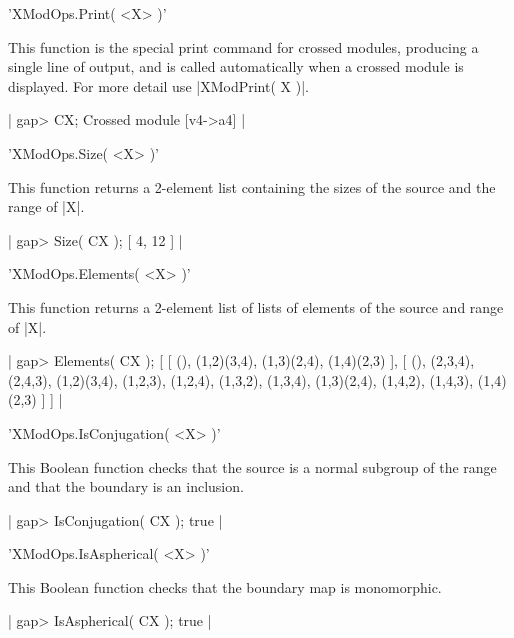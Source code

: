 %

'XModOps.Print( <X> )'

This  function  is  the  special print  command  for crossed modules,
producing a single line of output,  and is called automatically when a
crossed module is displayed.  For more detail use |XModPrint( X )|.

|    gap> CX;
    Crossed module [v4->a4] | 

%

'XModOps.Size( <X> )'

This function  returns  a 2-element  list containing  the sizes of the
source and the range of |X|.

|    gap> Size( CX );
    [ 4, 12 ] | 

%

'XModOps.Elements( <X> )'

This function returns  a 2-element list of   lists of elements of  the
source and range of |X|.

|    gap> Elements( CX );
    [ [ (), (1,2)(3,4), (1,3)(2,4), (1,4)(2,3) ],
      [ (), (2,3,4), (2,4,3), (1,2)(3,4), (1,2,3), (1,2,4), (1,3,2),
        (1,3,4), (1,3)(2,4), (1,4,2), (1,4,3), (1,4)(2,3) ] ]   | 

%

'XModOps.IsConjugation( <X> )'

This  Boolean function checks that the  source is a normal subgroup of
the range and that the boundary is an inclusion.

|    gap> IsConjugation( CX );
    true |

%

'XModOps.IsAspherical( <X> )'

This Boolean function checks that the boundary map is monomorphic.

|    gap> IsAspherical( CX );
    true |

